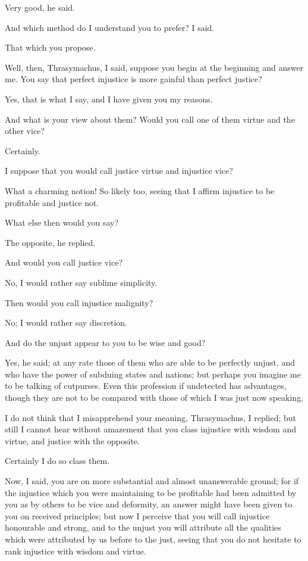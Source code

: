 Very good, he said.

And which method do I understand you to prefer? I said.

That which you propose.

Well, then, Thrasymachus, I said, suppose you begin at the beginning and
answer me. You say that perfect injustice is more gainful than perfect
justice?

Yes, that is what I say, and I have given you my reasons.

And what is your view about them? Would you call one of them virtue and
the other vice?

Certainly.

I suppose that you would call justice virtue and injustice vice?

What a charming notion! So likely too, seeing that I affirm injustice to
be profitable and justice not.

What else then would you say?

The opposite, he replied.

And would you call justice vice?

No, I would rather say sublime simplicity.

Then would you call injustice malignity?

No; I would rather say discretion.

And do the unjust appear to you to be wise and good?

Yes, he said; at any rate those of them who are able to be perfectly
unjust, and who have the power of subduing states and nations; but
perhaps you imagine me to be talking of cutpurses. Even this profession
if undetected has advantages, though they are not to be compared with
those of which I was just now speaking.

I do not think that I misapprehend your meaning, Thrasymachus, I
replied; but still I cannot hear without amazement that you class
injustice with wisdom and virtue, and justice with the opposite.

Certainly I do so class them.

Now, I said, you are on more substantial and almost unanswerable ground;
for if the injustice which you were maintaining to be profitable had
been admitted by you as by others to be vice and deformity, an answer
might have been given to you on received principles; but now I perceive
that you will call injustice honourable and strong, and to the unjust
you will attribute all the qualities which were attributed by us before
to the just, seeing that you do not hesitate to rank injustice with
wisdom and virtue.

